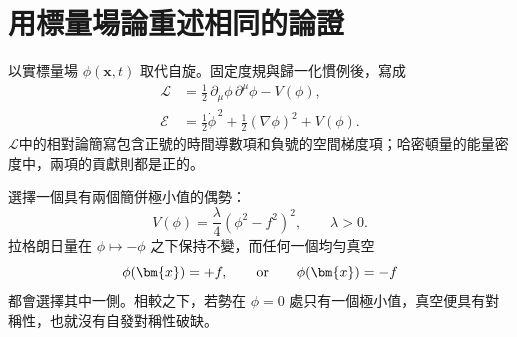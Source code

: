 \begin{classroomqa}
\end{classroomqa}

\begin{classroomqa}
\end{classroomqa}

\begin{classroomqa}
\end{classroomqa}

\section{用標量場論重述相同的論證}

以實標量場 \(\phi(\bm{x},t)\) 取代自旋。固定度規與歸一化慣例後，寫成
\begin{equation}
\begin{aligned}
  \mathcal L
  &=\frac12\,\partial_\mu\phi\,\partial^\mu\phi-V(\phi),
  \\
  \mathcal E
  &=\frac12\dot\phi^{\,2}+\frac12(\nabla\phi)^2+V(\phi).
\end{aligned}
  \label{eq:l07-real-scalar}
\end{equation}
\(\mathcal L\)中的相對論簡寫包含正號的時間導數項和負號的空間梯度項；哈密頓量的能量密度中，兩項的貢獻則都是正的。

選擇一個具有兩個簡併極小值的偶勢：
\begin{equation}
  V(\phi)=\frac{\lambda}{4}\left(\phi^2-f^2\right)^2,
  \qquad \lambda>0.
  \label{eq:l07-double-well}
\end{equation}
拉格朗日量在 \(\phi\mapsto-\phi\) 之下保持不變，而任何一個均勻真空
\begin{equation}
  \phi(\bm{x})=+f,
  \qquad\hbox{or}\qquad
  \phi(\bm{x})=-f
\end{equation}
都會選擇其中一側。相較之下，若勢在 \(\phi=0\) 處只有一個極小值，真空便具有對稱性，也就沒有自發對稱性破缺。

